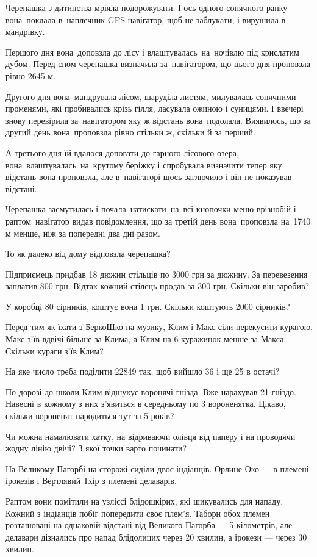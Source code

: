 \problem
Черепашка з дитинства мріяла подорожувати. І ось одного сонячного ранку
вона поклала в наплечник GPS-навігатор, щоб не заблукати,
і вирушила в мандрівку.

Першого дня вона доповзла до лісу і влаштувалась на ночівлю під крислатим
дубом. Перед сном черепашка визначила за навігатором, що цього дня
проповзла рівно 2645 м.

Другого дня вона мандрувала лісом, шаруділа листям, милувалась сонячними
променями, які пробивались крізь гілля, ласувала ожиною і суницями.
І ввечері знову перевірила за навігатором яку ж відстань вона подолала.
Виявилось, що за другий день вона проповзла рівно стільки ж,
скільки й за перший.

А третього дня їй вдалося доповзти до гарного лісового озера,
вона влаштувалась на крутому беріжку і спробувала визначити тепер
яку відстань вона проповзла, але в навігаторі щось заглючило
і він не показував відстані.

Черепашка засмутилась і почала натискати на всі кнопочки меню врізнобій
і раптом навігатор видав повідомлення, що за третій день вона проповзла
на 1740 м менше, ніж за попередні два дні разом.

То як далеко від дому відповзла черепашка?


\problem
Підприємець придбав 18 дюжин стільців по 3000 грн за дюжину.
За перевезення заплатив 800 грн.
Відтак кожний стілець продав за 300 грн.
Скільки він заробив?


\problem
У коробці 80 сірників, коштує вона 1 грн.
Скільки коштують 2000 сірників?


\problem
Перед тим як їхати з БеркоШко на музику, Клим і Макс сіли перекусити курагою.
Макс з’їв вдвічі більше за Клима, а Клим на 6 куражинок менше за Макса.
Скільки кураги з’їв Клим?


\problem
На яке число треба поділити 22849 так, щоб вийшло 36 і ще 25 в остачі?


\problem
По дорозі до школи Клим відшукує воронячі гнізда. Вже нарахував 21 гніздо.
Навесні в кожному з них з’явиться в середньому по 3 вороненятка.
Цікаво, скільки вороненят народиться тут за 5 років?


\problem
Чи можна намалювати хатку, на відриваючи олівця від паперу і на проводячи
жодну лінію двічі?
З якої точки варто починати?


\problem
На Великому Пагорбі на сторожі сиділи двоє індіанців.
Орлине Око --- в племені ірокезів і Вертлявий Тхір з племені делаварів.

Раптом вони помітили на узліссі блідошкірих, які шикувались для нападу.
Кожний з індіанців побіг попередити своє плем’я.
Табори обох племен розташовані на однаковій відстані від Великого Пагорба ---
5 кілометрів, але делавари дізнались про напад блідолицих через 20 хвилин,
а ірокези --- через 30 хвилин.


